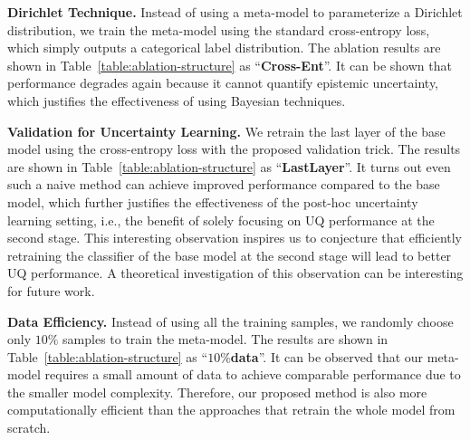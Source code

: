 \textbf{Dirichlet Technique.}
Instead of using a meta-model to parameterize a Dirichlet distribution, we train the meta-model using the standard cross-entropy loss, which simply outputs a categorical label distribution. The ablation results are shown in Table~\ref{table:ablation-structure} as ``\textbf{Cross-Ent}''. It can be shown that performance degrades again because it cannot quantify epistemic uncertainty, which justifies the effectiveness of using Bayesian techniques.

\textbf{Validation for Uncertainty Learning.}
We retrain the last layer of the base model using the cross-entropy loss with the proposed validation trick. The results are shown in Table~\ref{table:ablation-structure} as ``\textbf{LastLayer}''. It turns out even such a naive method can achieve improved performance compared to the base model, which further justifies the effectiveness of the post-hoc uncertainty learning setting, i.e., the benefit of solely focusing on UQ performance at the second stage. This interesting observation inspires us to conjecture that efficiently retraining the classifier of the base model at the second stage will lead to better UQ performance. A theoretical investigation of this observation can be interesting for future work.

\textbf{Data Efficiency.}
Instead of using all the training samples, we randomly choose only $10\%$ samples to train the meta-model. The results are shown in Table~\ref{table:ablation-structure} as ``$10\%$\textbf{data}''. It can be observed that our meta-model requires a small amount of data to achieve comparable performance due to the smaller model complexity. Therefore, our proposed method is also more computationally efficient than the approaches that retrain the whole model from scratch.

